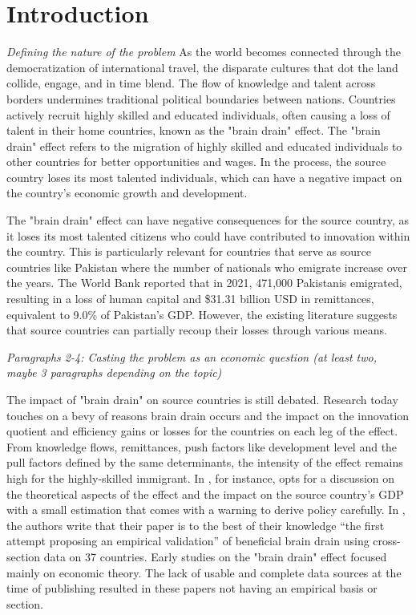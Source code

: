 \documentclass[12pt]{article}
\newcommand{\pointer}[1]{{\color{red} \center \textit{#1}}}
\begin{document}
\section{Introduction}
\pointer{Defining the nature of the problem}
As the world becomes connected through the democratization of international travel, the disparate cultures that dot the land collide, engage, and in time blend.
The flow of knowledge and talent across borders undermines traditional political boundaries between nations.
Countries actively recruit highly skilled and educated individuals, often causing a loss of talent in their home countries, known as the "brain drain" effect.
The "brain drain" effect refers to the migration of highly skilled and educated individuals to other countries for better opportunities and wages.
In the process, the source country loses its most talented individuals, which can have a negative impact on the country's economic growth and development.

The "brain drain" effect can have negative consequences for the source country, as it loses its most talented citizens who could have contributed to innovation within the country.
This is particularly relevant for countries that serve as source countries like Pakistan where the number of nationals who emigrate increase over the years.
The World Bank reported that in 2021, 471,000 Pakistanis emigrated, resulting in a loss of human capital and \$31.31 billion USD in remittances, equivalent to 9.0\% of Pakistan's GDP.
However, the existing literature suggests that source countries can partially recoup their losses through various means.

\pointer{Paragraphs 2-4: Casting the problem as an economic question (at least two, maybe 3 paragraphs depending on the topic)}

The impact of "brain drain" on source countries is still debated.
Research today touches on a bevy of reasons brain drain occurs and the impact on the innovation quotient and efficiency gains or losses for the countries on each leg of the effect.
From knowledge flows, remittances, push factors like development level and the pull factors defined by the same determinants, the intensity of the effect remains high for the highly-skilled immigrant.
In \citeauthor{hall_brain_2005}, for instance, opts for a discussion on the theoretical aspects of the effect and the impact on the source country's GDP with a small estimation that comes with a warning to derive policy carefully. In \citeauthor{beine_brain_2001}, the authors write that their paper is to the best of their knowledge ``the first attempt proposing an empirical validation'' of beneficial brain drain using cross-section data on 37 countries.
Early studies on the "brain drain" effect focused mainly on economic theory.
The lack of usable and complete data sources at the time of publishing resulted in these papers not having an empirical basis or section.
\end{document}
